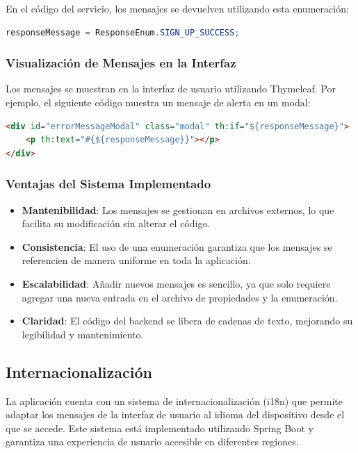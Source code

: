 \documentclass[draft]{scrbook}
\begin{document}
En el código del servicio, los mensajes se devuelven utilizando esta enumeración:

\begin{lstlisting}[language=Java]
responseMessage = ResponseEnum.SIGN_UP_SUCCESS;
\end{lstlisting}

\subsubsection{Visualización de Mensajes en la Interfaz}

Los mensajes se muestran en la interfaz de usuario utilizando Thymeleaf. Por ejemplo, el siguiente código muestra un mensaje de alerta en un modal:

\begin{lstlisting}[language=html]
<div id="errorMessageModal" class="modal" th:if="${responseMessage}">
    <p th:text="#{${responseMessage}}"></p>
</div>
\end{lstlisting}

\subsubsection{Ventajas del Sistema Implementado}

\begin{itemize}
    \item \textbf{Mantenibilidad}: Los mensajes se gestionan en archivos externos, lo que facilita su modificación sin alterar el código.
    \item \textbf{Consistencia}: El uso de una enumeración garantiza que los mensajes se referencien de manera uniforme en toda la aplicación.
    \item \textbf{Escalabilidad}: Añadir nuevos mensajes es sencillo, ya que solo requiere agregar una nueva entrada en el archivo de propiedades y la enumeración.
    \item \textbf{Claridad}: El código del backend se libera de cadenas de texto, mejorando su legibilidad y mantenimiento.
\end{itemize}



\subsection{Internacionalización}
\label{subsec:internacionalizacion}

La aplicación cuenta con un sistema de internacionalización (i18n) que permite adaptar los mensajes de la interfaz de usuario al idioma del dispositivo desde el que se accede. Este sistema está implementado utilizando Spring Boot y garantiza una experiencia de usuario accesible en diferentes regiones.
\end{document}
